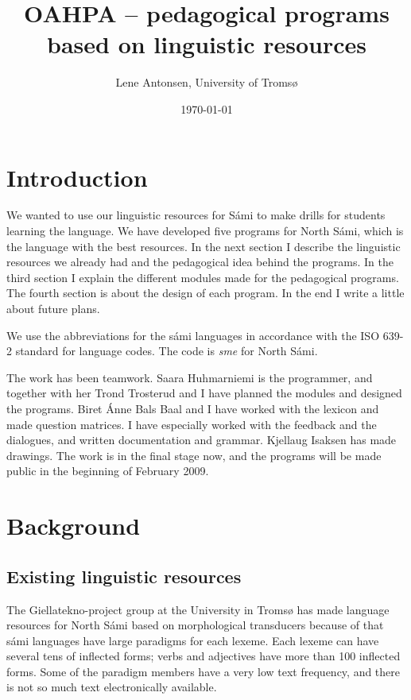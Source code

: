 \documentclass[a4paper,12pt]{article}
\begin{document}
\title{OAHPA -- pedagogical programs based on linguistic resources}

\author{Lene Antonsen, University of Tromsø}
\date{\today}
\maketitle
{}
 
\maketitle
\tableofcontents


\section{Introduction}
We wanted to use our linguistic resources for Sámi to make drills for students learning the language. We have developed five programs for North Sámi, which is the language with the best resources. In the next section I describe the linguistic resources we already had and the pedagogical idea behind the programs. In the third section I explain the different modules made for the pedagogical programs. The fourth section is about the design of each program. In the end I write a little about future plans.

We use the abbreviations for the sámi languages in accordance with the ISO 639-2 standard for language codes. The code is \textit{sme} for North Sámi. 

The work has been teamwork. Saara Huhmarniemi is the programmer, and together with her Trond Trosterud and I have planned the modules and designed the programs. Biret Ánne Bals Baal and I have worked with the lexicon and made question matrices. I have especially worked with the feedback and the dialogues, and written documentation and grammar. Kjellaug Isaksen has made drawings. The work is in the final stage now, and the programs will be made public in the beginning of February 2009. 

\section{Background}


\subsection{Existing linguistic resources}

The Giellatekno-project group at the University in Tromsø has made language resources for North Sámi based on morphological transducers because of that sámi languages have large paradigms for each lexeme. Each lexeme can have several tens of inflected forms; verbs and adjectives have more than 100 inflected forms. Some of the paradigm members have a very low text frequency, and there is not so much text electronically available. \citep{TT07}  
\end{document}

